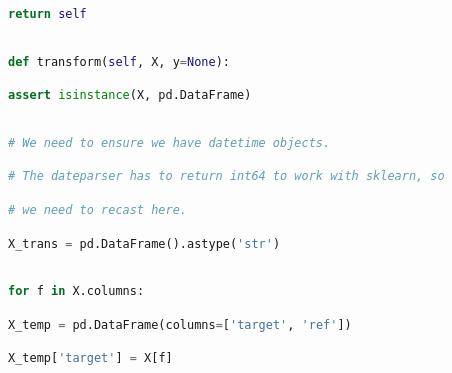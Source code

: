 \documentclass[
  11pt,
  a4paper,
  DIV=12,captions=tableheading,oneside]{scrbook}
\begin{document}
\begin{lstlisting}[language=Python,stepnumber=2,basicstyle=\footnotesize]
        return self\end{lstlisting}
\begin{lstlisting}[language=Python,stepnumber=2,basicstyle=\footnotesize]
\end{lstlisting}
\begin{lstlisting}[language=Python,stepnumber=2,basicstyle=\footnotesize]
    def transform(self, X, y=None):\end{lstlisting}
\begin{lstlisting}[language=Python,stepnumber=2,basicstyle=\footnotesize]
        assert isinstance(X, pd.DataFrame)\end{lstlisting}
\begin{lstlisting}[language=Python,stepnumber=2,basicstyle=\footnotesize]
\end{lstlisting}
\begin{lstlisting}[language=Python,stepnumber=2,basicstyle=\footnotesize]
        # We need to ensure we have datetime objects.\end{lstlisting}
\begin{lstlisting}[language=Python,stepnumber=2,basicstyle=\footnotesize]
        # The dateparser has to return int64 to work with sklearn, so\end{lstlisting}
\begin{lstlisting}[language=Python,stepnumber=2,basicstyle=\footnotesize]
        # we need to recast here.\end{lstlisting}
\begin{lstlisting}[language=Python,stepnumber=2,basicstyle=\footnotesize]
        X_trans = pd.DataFrame().astype('str')\end{lstlisting}
\begin{lstlisting}[language=Python,stepnumber=2,basicstyle=\footnotesize]
\end{lstlisting}
\begin{lstlisting}[language=Python,stepnumber=2,basicstyle=\footnotesize]
        for f in X.columns:\end{lstlisting}
\begin{lstlisting}[language=Python,stepnumber=2,basicstyle=\footnotesize]
            X_temp = pd.DataFrame(columns=['target', 'ref'])\end{lstlisting}
\begin{lstlisting}[language=Python,stepnumber=2,basicstyle=\footnotesize]
            X_temp['target'] = X[f]\end{lstlisting}
\end{document}
